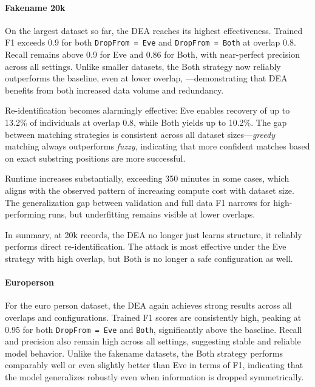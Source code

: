 \paragraph{Fakename 20k}

On the largest dataset so far, the DEA reaches its highest effectiveness.
Trained F1 exceeds 0.9 for both \texttt{DropFrom = Eve} and \texttt{DropFrom = Both} at overlap 0.8.
Recall remains above 0.9 for Eve and 0.86 for Both, with near-perfect precision across all settings.
Unlike smaller datasets, the Both strategy now reliably outperforms the baseline, even at lower overlap, —demonstrating that DEA benefits from both increased data volume and redundancy.

Re-identification becomes alarmingly effective: Eve enables recovery of up to 13.2\% of individuals at overlap 0.8, while Both yields up to 10.2\%.
The gap between matching strategies is consistent across all dataset sizes—\emph{greedy} matching always outperforms \emph{fuzzy}, indicating that more confident matches based on exact substring positions are more successful.

Runtime increases substantially, exceeding 350 minutes in some cases, which aligns with the observed pattern of increasing compute cost with dataset size.
The generalization gap between validation and full data F1 narrows for high-performing runs, but underfitting remains visible at lower overlaps.

In summary, at 20k records, the DEA no longer just learns structure, it reliably performs direct re-identification.
The attack is most effective under the Eve strategy with high overlap, but Both is no longer a safe configuration as well.

\paragraph{Europerson}

For the euro person dataset, the DEA again achieves strong results across all overlaps and configurations.
Trained F1 scores are consistently high, peaking at 0.95 for both \texttt{DropFrom = Eve} and \texttt{Both}, significantly above the baseline.
Recall and precision also remain high across all settings, suggesting stable and reliable model behavior.
Unlike the fakename datasets, the Both strategy performs comparably well or even slightly better than Eve in terms of F1, indicating that the model generalizes robustly even when information is dropped symmetrically.


